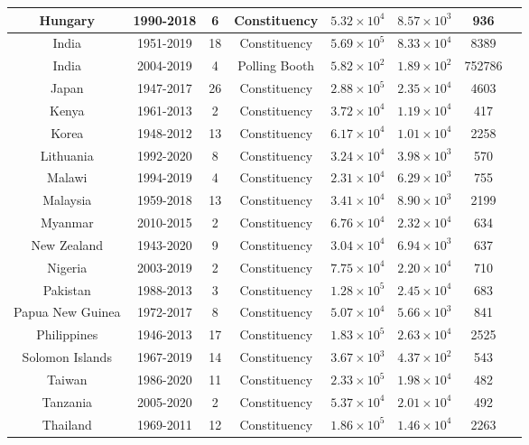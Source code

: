 \begin{table}[H]
{\begin{tabular}{|c|c|c|c|c|c|c|c|}
Hungary & 1990-2018 & 6 & Constituency & $5.32\times 10^{4}$ & $8.57\times 10^{3}$ & 936\\ \hline
India & 1951-2019 & 18 & Constituency & $5.69\times 10^{5}$ & $8.33\times 10^{4}$ & 8389\\ \hline
India & 2004-2019 & 4 & Polling Booth & $5.82\times 10^{2}$ & $1.89\times 10^{2}$ & 752786\\ \hline
Japan & 1947-2017 & 26 & Constituency & $2.88\times 10^{5}$ & $2.35\times 10^{4}$ & 4603\\ \hline
Kenya & 1961-2013 & 2 & Constituency & $3.72\times 10^{4}$ & $1.19\times 10^{4}$ & 417\\ \hline
Korea & 1948-2012 & 13 & Constituency & $6.17\times 10^{4}$ & $1.01\times 10^{4}$ & 2258\\ \hline
Lithuania & 1992-2020 & 8 & Constituency & $3.24\times 10^{4}$ & $3.98\times 10^{3}$ & 570\\ \hline
Malawi & 1994-2019 & 4 & Constituency & $2.31\times 10^{4}$ & $6.29\times 10^{3}$ & 755\\ \hline
Malaysia & 1959-2018 & 13 & Constituency & $3.41\times 10^{4}$ & $8.90\times 10^{3}$ & 2199\\ \hline
Myanmar & 2010-2015 & 2 & Constituency & $6.76\times 10^{4}$ & $2.32\times 10^{4}$ & 634\\ \hline
New Zealand & 1943-2020 & 9 & Constituency & $3.04\times 10^{4}$ & $6.94\times 10^{3}$ & 637\\ \hline
Nigeria & 2003-2019 & 2 & Constituency & $7.75\times 10^{4}$ & $2.20\times 10^{4}$ & 710\\ \hline
Pakistan & 1988-2013 & 3 & Constituency & $1.28\times 10^{5}$ & $2.45\times 10^{4}$ & 683\\ \hline
Papua New Guinea & 1972-2017 & 8 & Constituency & $5.07\times 10^{4}$ & $5.66\times 10^{3}$ & 841\\ \hline
Philippines & 1946-2013 & 17 & Constituency & $1.83\times 10^{5}$ & $2.63\times 10^{4}$ & 2525\\ \hline
Solomon Islands & 1967-2019 & 14 & Constituency & $3.67\times 10^{3}$ & $4.37\times 10^{2}$ & 543\\ \hline
Taiwan & 1986-2020 & 11 & Constituency & $2.33\times 10^{5}$ & $1.98\times 10^{4}$ & 482\\ \hline
Tanzania & 2005-2020 & 2 & Constituency & $5.37\times 10^{4}$ & $2.01\times 10^{4}$ & 492\\ \hline
Thailand & 1969-2011 & 12 & Constituency & $1.86\times 10^{5}$ & $1.46\times 10^{4}$ & 2263\\ \hline

\end{tabular}}
\end{table}
